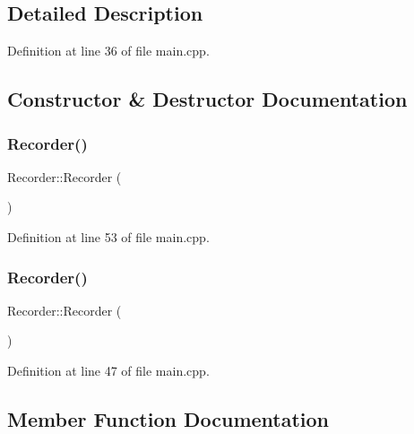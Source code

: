 \subsection{Detailed Description}


Definition at line 36 of file main.\+cpp.



\subsection{Constructor \& Destructor Documentation}
\mbox{\label{classRecorder_af0b4f40e7c67f16b0ffff13712149d78}} 
\subsubsection{\texorpdfstring{Recorder()}{Recorder()}\hspace{0.1cm}{\footnotesize\ttfamily [1/2]}}
{\footnotesize\ttfamily Recorder\+::\+Recorder (\begin{DoxyParamCaption}{ }\end{DoxyParamCaption})\hspace{0.3cm}{\ttfamily [inline]}}



Definition at line 53 of file main.\+cpp.

\mbox{\label{classRecorder_af0b4f40e7c67f16b0ffff13712149d78}} 
\subsubsection{\texorpdfstring{Recorder()}{Recorder()}\hspace{0.1cm}{\footnotesize\ttfamily [2/2]}}
{\footnotesize\ttfamily Recorder\+::\+Recorder (\begin{DoxyParamCaption}{ }\end{DoxyParamCaption})\hspace{0.3cm}{\ttfamily [inline]}}



Definition at line 47 of file main.\+cpp.



\subsection{Member Function Documentation}
\mbox{\label{classRecorder_a25b5d0cb6f7e7c591cabb0b34ebc81e2}} 
